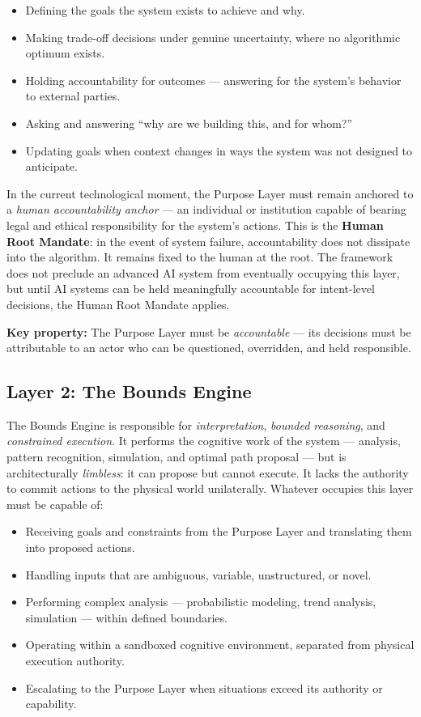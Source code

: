 \documentclass[12pt]{article}
\theoremstyle{plain}
\begin{document}
\begin{itemize}[noitemsep]
    \item Defining the goals the system exists to achieve and why.
    \item Making trade-off decisions under genuine uncertainty, where no algorithmic optimum exists.
    \item Holding accountability for outcomes --- answering for the system's behavior to external parties.
    \item Asking and answering ``why are we building this, and for whom?''
    \item Updating goals when context changes in ways the system was not designed to anticipate.
\end{itemize}

In the current technological moment, the Purpose Layer must remain anchored to a \textit{human accountability anchor} --- an individual or institution capable of bearing legal and ethical responsibility for the system's actions. This is the \textbf{Human Root Mandate}: in the event of system failure, accountability does not dissipate into the algorithm. It remains fixed to the human at the root. The framework does not preclude an advanced AI system from eventually occupying this layer, but until AI systems can be held meaningfully accountable for intent-level decisions, the Human Root Mandate applies.

\textbf{Key property:} The Purpose Layer must be \textit{accountable} --- its decisions must be attributable to an actor who can be questioned, overridden, and held responsible.

\subsection{Layer 2: The Bounds Engine}

The Bounds Engine is responsible for \textit{interpretation}, \textit{bounded reasoning}, and \textit{constrained execution}. It performs the cognitive work of the system --- analysis, pattern recognition, simulation, and optimal path proposal --- but is architecturally \textit{limbless}: it can propose but cannot execute. It lacks the authority to commit actions to the physical world unilaterally. Whatever occupies this layer must be capable of:

\begin{itemize}[noitemsep]
    \item Receiving goals and constraints from the Purpose Layer and translating them into proposed actions.
    \item Handling inputs that are ambiguous, variable, unstructured, or novel.
    \item Performing complex analysis --- probabilistic modeling, trend analysis, simulation --- within defined boundaries.
    \item Operating within a sandboxed cognitive environment, separated from physical execution authority.
    \item Escalating to the Purpose Layer when situations exceed its authority or capability.
\end{itemize}
\end{document}
